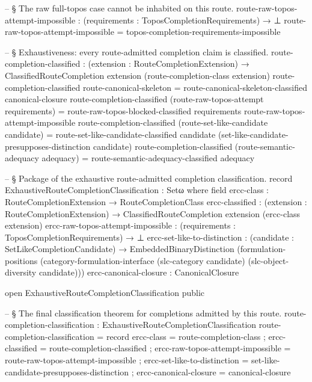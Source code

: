 \documentclass[11pt]{article}
\begin{document}
\begin{code}
-- § The raw full-topos case cannot be inhabited on this route.
route-raw-topos-attempt-impossible :
  (requirements : ToposCompletionRequirements) → ⊥
route-raw-topos-attempt-impossible =
  topos-completion-requirements-impossible

-- § Exhaustiveness: every route-admitted completion claim is classified.
route-completion-classified :
  (extension : RouteCompletionExtension) →
  ClassifiedRouteCompletion extension (route-completion-class extension)
route-completion-classified route-canonical-skeleton =
  route-canonical-skeleton-classified canonical-closure
route-completion-classified (route-raw-topos-attempt requirements) =
  route-raw-topos-blocked-classified
    requirements
    route-raw-topos-attempt-impossible
route-completion-classified (route-set-like-candidate candidate) =
  route-set-like-candidate-classified
    candidate
    (set-like-candidate-presupposes-distinction candidate)
route-completion-classified (route-semantic-adequacy adequacy) =
  route-semantic-adequacy-classified adequacy

-- § Package of the exhaustive route-admitted completion classification.
record ExhaustiveRouteCompletionClassification : Setω where
  field
    ercc-class : RouteCompletionExtension → RouteCompletionClass
    ercc-classified :
      (extension : RouteCompletionExtension) →
      ClassifiedRouteCompletion extension (ercc-class extension)
    ercc-raw-topos-attempt-impossible :
      (requirements : ToposCompletionRequirements) → ⊥
    ercc-set-like-to-distinction :
      (candidate : SetLikeCompletionCandidate) →
      EmbeddedBinaryDistinction
        (formulation-positions
          (category-formulation-interface
            (slc-category candidate)
            (slc-object-diversity candidate)))
    ercc-canonical-closure : CanonicalClosure

open ExhaustiveRouteCompletionClassification public

-- § The final classification theorem for completions admitted by this route.
route-completion-classification : ExhaustiveRouteCompletionClassification
route-completion-classification = record
  { ercc-class                        = route-completion-class
  ; ercc-classified                   = route-completion-classified
  ; ercc-raw-topos-attempt-impossible = route-raw-topos-attempt-impossible
  ; ercc-set-like-to-distinction      = set-like-candidate-presupposes-distinction
  ; ercc-canonical-closure            = canonical-closure
  }
\end{code}
\end{document}
